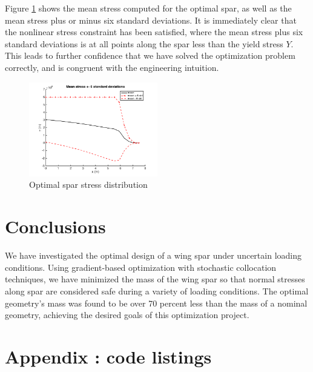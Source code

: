 \documentclass[10pt]{article}
\begin{document}
Figure \ref{fig:optimal_stress} shows the mean stress computed
for the optimal spar, as well as the mean stress plus or minus
six standard deviations. It is immediately clear that the
nonlinear stress constraint has been satisfied, where the
mean stress plus six standard deviations is at all points
along the spar less than the yield stress $Y$. This leads
to further confidence that
we have solved the optimization problem
correctly, and is congruent with the engineering intuition.
%
\begin{figure}[hbt!]
\centering
\includegraphics[width=0.5\textwidth]{optimal_stress}
\caption{Optimal spar stress distribution}
\label{fig:optimal_stress}
\end{figure}

\section{Conclusions}

We have investigated the optimal design of a wing
spar under uncertain loading conditions. Using
gradient-based optimization with 
stochastic collocation techniques, we have minimized the mass of
the wing spar so that normal stresses along spar are
considered safe during a variety of loading conditions.
The optimal geometry's mass was found to be over 70
percent less than the mass of a nominal geometry,
achieving the desired goals of this optimization
project.

\newpage

\section{Appendix : code listings}


\newpage

\newpage

\newpage

\newpage

\end{document}
